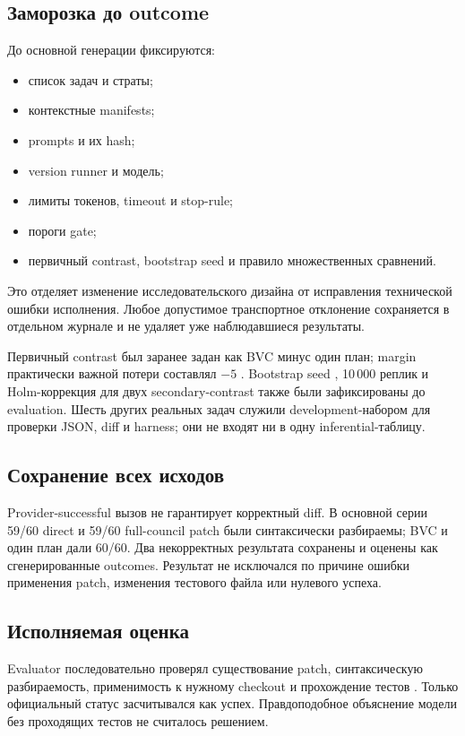\documentclass[11pt]{article}
\begin{document}
\subsection{Заморозка до outcome}

До основной генерации фиксируются:
\begin{itemize}
  \item список задач и страты;
  \item контекстные manifests;
  \item prompts и их hash;
  \item version runner и модель;
  \item лимиты токенов, timeout и stop-rule;
  \item пороги gate;
  \item первичный contrast, bootstrap seed и правило множественных сравнений.
\end{itemize}
Это отделяет изменение исследовательского дизайна от исправления технической
ошибки исполнения. Любое допустимое транспортное отклонение сохраняется в
отдельном журнале и не удаляет уже наблюдавшиеся результаты.

Первичный contrast был заранее задан как BVC минус один план; margin
практически важной потери составлял \(-5\) \pp. Bootstrap seed
, 10\,000 реплик и Holm-коррекция для двух
secondary-contrast также были зафиксированы до evaluation. Шесть других
реальных задач служили development-набором для проверки JSON, diff и harness;
они не входят ни в одну inferential-таблицу.

\subsection{Сохранение всех исходов}

Provider-successful вызов не гарантирует корректный diff. В основной серии
59/60 direct и 59/60 full-council patch были синтаксически разбираемы; BVC
и один план дали 60/60. Два некорректных результата сохранены и оценены как
сгенерированные outcomes. Результат не исключался по причине ошибки
применения patch, изменения тестового файла или нулевого успеха.

\subsection{Исполняемая оценка}

Evaluator последовательно проверял существование patch, синтаксическую
разбираемость, применимость к нужному checkout и прохождение тестов
\dataset{}. Только официальный статус  засчитывался как
успех. Правдоподобное объяснение модели без проходящих тестов не считалось
решением.
\end{document}
